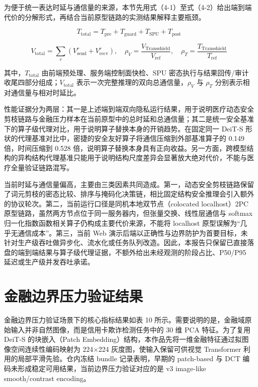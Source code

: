 为便于统一表达时延与通信量的来源，本节先用式（4-1）至式（4-2）给出端到端代价的分解形式，再结合当前原型链路的实测结果解释主要瓶颈。

\begin{equation}
T_{\text{total}}=T_{\text{pre}}+T_{\text{guard}}+T_{\text{SPU}}+T_{\text{post}}
\tag{4-1}
\end{equation}

\begin{equation}
V_{\text{total}}=\sum_{r}\left(V_{\text{send}}^{r}+V_{\text{recv}}^{r}\right), \quad \rho_V=\frac{V_{\mathrm{Transshield}}}{V_{\text{ref}}}, \quad \rho_T=\frac{T_{\mathrm{Transshield}}}{T_{\text{ref}}}
\tag{4-2}
\end{equation}

其中，$T_{\text{total}}$ 由前端预处理、服务端控制面快检、SPU 密态执行与结果回传/审计收尾四部分组成；$V_{\text{total}}$ 表示一次完整推理的双向总通信量，$\rho_V$ 与 $\rho_T$ 分别表示相对通信量与相对时延比。

性能证据分为两层：其一是上述端到端双向隐私运行结果，用于说明医疗动态安全剪枝链路与金融压力样本在当前原型中的总时延和总通信量；其二是统一安全基准下的算子级代理对比，用于说明算子替换本身的开销趋势。在固定同一 DeiT-S 形状的代理基准对比中，密捷的安全友好算子将通信压缩到外部基准算子的 0.149 倍，时间压缩到 0.528 倍，说明算子替换本身具有正向收益。另一方面，跨模型结构的异构结构代理基准只能用于说明结构尺度差异会显著放大绝对代价，不能与医疗全量验证链路混写。

当前时延与通信量偏高，主要由三类因素共同造成。第一，动态安全剪枝链路保留了词元剪枝的密态比较、排序与掩码化决策链，相比固定结构安全推理会引入额外的协议轮次。第二，当前运行口径是同机本地双节点（colocated localhost）2PC 原型链路，虽然两方节点位于同一服务器内，但张量交换、线性层通信与 softmax 归一化指数函数相关算子仍构成主要代价来源，不能将 localhost 原型误解为“几乎无通信成本”。第三，当前 Web 演示后端以正确性与边界防护为首要目标，未针对生产级吞吐做异步化、流水化或任务队列改造。因此，本报告只保留已直接落盘的端到端结果与算子级代理证据，不额外给出未经观测的阶段占比、P50/P95 延迟或生产级并发吞吐承诺。

\section{金融边界压力验证结果}

金融边界压力验证场景下的核心指标结果如表 10 所示。需要说明的是，金融域原始输入并非自然图像，而是信用卡欺诈检测任务中的 30 维 PCA 特征。为了复用 DeiT-S 的块嵌入（Patch Embedding）结构，本作品先将一维金融特征通过拟图像空间连续性编码映射为 224×224 灰度图，使输入保留可供视觉 Transformer 利用的局部平滑先验。仓内冻结 bundle 记录表明，早期的 patch-based 与 DCT 编码未形成稳定可用结果，当前边界压力验证对应的是 v3 image-like smooth/contrast encoding。

